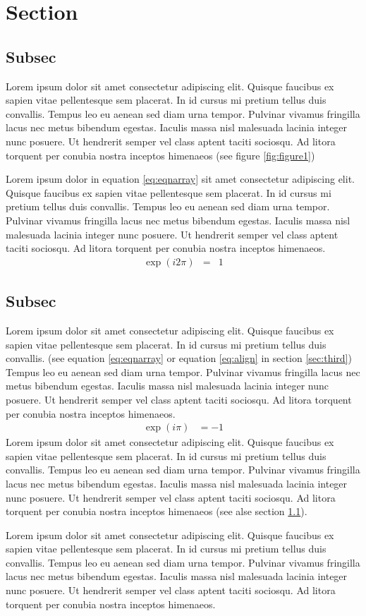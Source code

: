 \section{Section}
\subsection{Subsec}\label{sec:first}
Lorem ipsum dolor sit amet consectetur adipiscing elit. Quisque
faucibus ex sapien vitae pellentesque sem placerat. In id cursus mi
pretium tellus duis convallis. Tempus leo eu aenean sed diam urna
tempor. Pulvinar vivamus fringilla lacus nec metus bibendum egestas.
Iaculis massa nisl malesuada lacinia integer nunc posuere. Ut
hendrerit semper vel class aptent taciti sociosqu. Ad litora torquent
per conubia nostra inceptos himenaeos (see figure \ref{fig:figure1})

Lorem ipsum dolor in equation \eqref{eq:eqnarray} sit amet consectetur
adipiscing elit. Quisque faucibus ex sapien vitae pellentesque sem
placerat. In id cursus mi pretium tellus duis convallis. Tempus leo eu
aenean sed diam urna tempor. Pulvinar vivamus fringilla lacus nec
metus bibendum egestas. Iaculis massa nisl malesuada lacinia integer
nunc posuere. Ut hendrerit semper vel class aptent taciti sociosqu. Ad
litora torquent per conubia nostra inceptos himenaeos.
\begin{eqnarray}
  \label{eq:eqnarray}
  \exp(i2\pi)&=&1
\end{eqnarray}

\subsection{Subsec}\label{sec:second}
Lorem ipsum dolor sit amet consectetur adipiscing elit. Quisque
faucibus ex sapien vitae pellentesque sem placerat. In id cursus mi
pretium tellus duis convallis. (see equation \eqref{eq:eqnarray} or
equation \ref{eq:align} in section \ref{sec:third}) Tempus leo eu
aenean sed diam urna tempor. Pulvinar vivamus fringilla lacus nec
metus bibendum egestas. Iaculis massa nisl malesuada lacinia integer
nunc posuere. Ut hendrerit semper vel class aptent taciti sociosqu. Ad
litora torquent per conubia nostra inceptos himenaeos.
\begin{align}
  \label{eq:align}
  \exp(i\pi)&=-1
\end{align}
Lorem ipsum dolor sit amet consectetur adipiscing elit. Quisque
faucibus ex sapien vitae pellentesque sem placerat. In id cursus mi
pretium tellus duis convallis. Tempus leo eu aenean sed diam urna
tempor. Pulvinar vivamus fringilla lacus nec metus bibendum egestas.
Iaculis massa nisl malesuada lacinia integer nunc posuere. Ut
hendrerit semper vel class aptent taciti sociosqu. Ad litora torquent
per conubia nostra inceptos himenaeos (see alse section \ref{sec:first}).

Lorem ipsum dolor sit amet consectetur adipiscing elit. Quisque
faucibus ex sapien vitae pellentesque sem placerat. In id cursus mi
pretium tellus duis convallis. Tempus leo eu aenean sed diam urna
tempor. Pulvinar vivamus fringilla lacus nec metus bibendum egestas.
Iaculis massa nisl malesuada lacinia integer nunc posuere. Ut
hendrerit semper vel class aptent taciti sociosqu. Ad litora torquent
per conubia nostra inceptos himenaeos.

